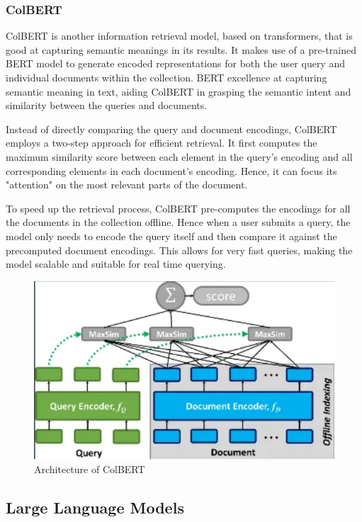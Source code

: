 \documentclass[conference]{IEEEtran}
\begin{document}
\subsubsection{ColBERT}
ColBERT is another information retrieval model, based on transformers, that is good at capturing semantic meanings in its results. It makes use of a pre-trained BERT model to generate encoded representations for both the user query and individual documents within the collection. BERT excellence at capturing semantic meaning in text, aiding ColBERT in grasping the semantic intent and similarity between the queries and documents. 

Instead of directly comparing the query and document encodings, ColBERT employs a two-step approach for efficient retrieval. It first computes the maximum similarity score between each element in the query's encoding and all corresponding elements in each document's encoding. Hence, it can focus its "attention" on the most relevant parts of the document. 

To speed up the retrieval process, ColBERT pre-computes the encodings for all the documents in the collection offline. Hence when a user submits a query, the model only needs to encode the query itself and then compare it against the precomputed document encodings. This allows for very fast queries, making the model scalable and suitable for real time querying.

\begin{figure}[htp]
    \centering
    \includegraphics[width=\columnwidth]{images/colbert.png}
    \caption{Architecture of ColBERT \cite{colbert}}
    \label{fig:colbert}
\end{figure}

\subsection{Large Language Models}
\end{document}

